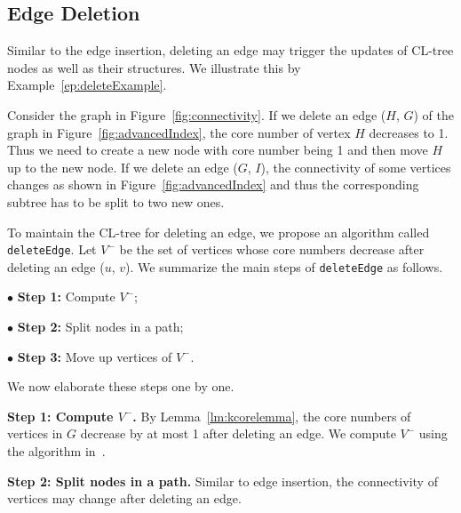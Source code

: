 \subsection{Edge Deletion}
\label{sec:edgeDeletion}

Similar to the edge insertion, deleting an edge may trigger the updates of CL-tree nodes as well as their structures. We illustrate this by Example~\ref{ep:deleteExample}.

\begin{example}
\label{ep:deleteExample}
Consider the graph in Figure~\ref{fig:connectivity}. If we delete an edge ($H$, $G$) of the graph in Figure~\ref{fig:advancedIndex}, the core number of vertex $H$ decreases to 1. Thus we need to create a new node with core number being 1 and then move $H$ up to the new node. If we delete an edge ($G$, $I$), the connectivity of some vertices changes as shown in Figure~\ref{fig:advancedIndex} and thus the corresponding subtree has to be split to two new ones.
\end{example}
To maintain the CL-tree for deleting an edge, we propose an algorithm called {\tt deleteEdge}.
Let $V^-$ be the set of vertices whose core numbers decrease after deleting an edge ($u$, $v$).
We summarize the main steps of {\tt deleteEdge} as follows.

$\bullet$ \textbf{Step 1:} Compute $V^-$;

$\bullet$ \textbf{Step 2:} Split nodes in a path;

$\bullet$ \textbf{Step 3:} Move up vertices of $V^-$.

We now elaborate these steps one by one.

\textbf{Step 1: Compute $V^-$.}
By Lemma~\ref{lm:kcorelemma}, the core numbers of vertices in $G$ decrease by at most 1 after deleting an edge.
We compute $V^-$ using the algorithm in~\cite{kcoreUpdate}.

\textbf{Step 2: Split nodes in a path.}
Similar to edge insertion, the connectivity of vertices may change after deleting an edge. 

